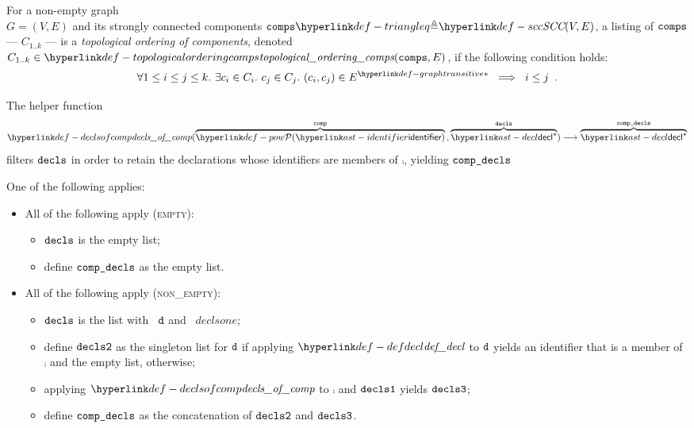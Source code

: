\hypertarget{def-topologicalorderingcomps}{}
\begin{definition}
For a non-empty graph \\
$G=(V, E)$ and its strongly connected components $\comps \triangleq \SCC(V, E)$,
a listing of $\texttt{comps}$ ---
$C_{1..k}$ --- is a \emph{topological ordering of components},
denoted \\
$C_{1..k} \in \topologicalorderingcomps(\comps, E)$, if the following condition holds:
\[
  \forall 1 \leq i \leq j \leq k.\ \exists c_i\in C_i.\ c_j\in C_j.\ (c_i,c_j) \in \graphtransitive{E} \;\;\Longrightarrow\;\;
  i \leq j \enspace .
\]
\end{definition}

\hypertarget{def-declsofcomp}{}
The helper function
\[
\declsofcomp(
  \overname{\pow{\identifier}}{\comp} \aslsep
  \overname{\decl^*}{\decls}
) \aslto \overname{\decl^*}{\compdecls}
\]
filters $\texttt{decls}$ in order to retain the declarations whose identifiers are members of $\comp$,
yielding $\texttt{comp\_decls}$

\ProseParagraph
One of the following applies:
\begin{itemize}
  \item All of the following apply (\textsc{empty}):
  \begin{itemize}
    \item $\texttt{decls}$ is the empty list;
    \item define $\texttt{comp\_decls}$ as the empty list.
  \end{itemize}

  \item All of the following apply (\textsc{non\_empty}):
  \begin{itemize}
    \item $\texttt{decls}$ is the list with \head\ $\texttt{d}$ and \tail\ $declsone$;
    \item define $\texttt{decls2}$ as the singleton list for $\texttt{d}$ if applying $\defdecl$ to $\texttt{d}$ yields an identifier
          that is a member of $\comp$ and the empty list, otherwise;
    \item applying $\declsofcomp$ to $\comp$ and $\texttt{decls1}$ yields $\texttt{decls3}$;
    \item define $\texttt{comp\_decls}$ as the concatenation of $\texttt{decls2}$ and $\texttt{decls3}$.
  \end{itemize}
\end{itemize}

\FormallyParagraph
{}

